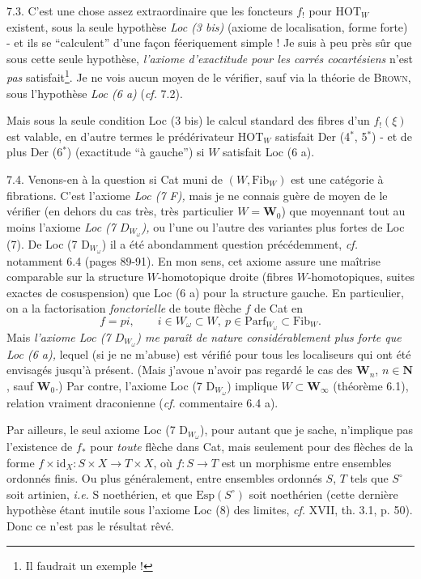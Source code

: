 7.3. C'est une chose assez extraordinaire que les foncteurs $f_!$ pour $\mathrm{HOT}_W$ existent, sous la seule hypothèse \textit{Loc (3 bis)} (axiome de localisation, forme forte) - et ils se “calculent” d'une façon féeriquement simple ! Je suis à peu près sûr que sous cette seule hypothèse, \textit{l'axiome d'exactitude pour les carrés cocartésiens} n'est \textit{pas} satisfait\footnote[47]{Il faudrait un exemple !}. Je ne vois aucun moyen de le vérifier, sauf via la théorie de \textsc{Brown}, sous l'hypothèse \textit{Loc (6 a)} (\textit{cf.} 7.2).

Mais sous la seule condition Loc (3 bis) le calcul standard des fibres d'un $f_!(\xi)$
est valable, en d'autre termes le prédérivateur $\mathrm{HOT}_W$ satisfait Der (4$^*$, 5$^*$) - et de plus Der (6$^*$) (exactitude “à gauche”) si $W$ satisfait Loc (6 a). %

7.4. Venons-en à la question si Cat muni de $(W,\mathrm{Fib}_W)$ est une catégorie à fibrations. C'est l'axiome \textit{Loc (7 F),} mais je ne connais guère de moyen de le vérifier (en dehors du cas très, très particulier $W = \mathbf{W}_0$) que moyennant tout au moins l'axiome \textit{Loc (7 $D_{W_\omega}$),} ou l'une ou l'autre des variantes plus fortes de Loc (7). De Loc (7 $\mathrm{D}_{W_\omega}$) il a été abondamment question précédemment, \textit{cf.} notamment 6.4 (pages 89-91). En mon sens, cet axiome assure une maîtrise comparable sur la structure $W$-homotopique droite (fibres $W$-homotopiques, suites exactes de cosuspension) que Loc (6 a) pour la
structure gauche. En particulier, on a la factorisation \textit{fonctorielle} de toute flèche $f$ de Cat en
\[
f = pi, \qquad i \in W_\omega \subset W,\ p \in \mathrm{Parf}_{W_\omega} \subset \mathrm{Fib}_W .
\]
Mais \textit{l'axiome Loc (7 $D_{W_\omega}$) me paraît de nature considérablement plus forte que Loc (6 a),} lequel (si je ne m'abuse) est vérifié pour tous les localiseurs qui ont été envisagés jusqu'à présent. (Mais j'avoue n'avoir pas regardé le cas des $\mathbf{W}_n$, $n \in \mathbf{N}$, sauf $\mathbf{W}_0$.) Par contre, l'axiome Loc (7 $\mathrm{D}_{W_\omega}$) implique $W \subset \mathbf{W}_\infty$ (théorème 6.1), relation vraiment draconienne (\textit{cf.} commentaire 6.4 a).

Par ailleurs, le seul axiome Loc (7 $\mathrm{D}_{W_\omega}$), pour autant que je sache, n'implique pas l'existence de $f_*$ pour \textit{toute} flèche dans Cat, mais seulement pour des
flèches de la forme $f \times \mathrm{id}_X : S \times X \longrightarrow T \times X$, où $f : S \longrightarrow T$ est un morphisme entre ensembles ordonnés finis. Ou plus généralement, entre ensembles ordonnés $S$, $T$ tels que $S^\circ$ soit artinien, \textit{i.e.} $\mathrm{S}$ noethérien, et que $\mathrm{Esp}(S^\circ)$ soit noethérien (cette dernière hypothèse étant inutile sous l'axiome Loc (8) des limites, \textit{cf.} XVII, th. 3.1, p. 50). Donc ce n'est pas le résultat rêvé.

